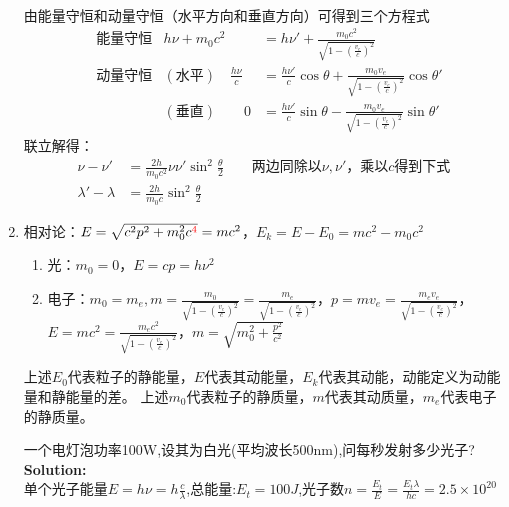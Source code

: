 \documentclass{article}
\begin{document}
\begin{enumerate}[label=(\arabic*)]
\begin{tabular}{cccc|ccc}
				\end{tabular}\\
				由能量守恒和动量守恒（水平方向和垂直方向）可得到三个方程式
				\begin{align}
					&\text{能量守恒} & h\nu+m_0c^2 &= h\nu'+\frac{m_0c^2}{\sqrt{1-(\frac{v_e}{c})^2}} \label{能量守恒eq1} \\
					&\text{动量守恒} & (\text{水平}) \quad \frac{h\nu}{c} &= \frac{h\nu'}{c}\cos\theta + \frac{m_0v_e}{\sqrt{1-(\frac{v_e}{c})^2}}\cos\theta' \label{水平动量eq2} \\
					&   & (\text{垂直}) \qquad 0 &= \frac{h\nu'}{c}\sin\theta - \frac{m_0v_e}{\sqrt{1-(\frac{v_e}{c})^2}}\sin\theta' \label{垂直动量eq3}
				\end{align}
				联立解得：
				\[
					\begin{aligned}
						\nu-\nu' &= \frac{2h}{m_0c^2}\nu \nu'\sin^2\frac{\theta}{2} \qquad \text{两边同除以$\nu,\nu'$，乘以$c$得到下式}\\
						\lambda'-\lambda &= \frac{2h}{m_0c}\sin^2\frac{\theta}{2}
					\end{aligned}
				\]
	\item 相对论：$E=\sqrt{c^2p^2+m_0^2c^{\color{red} 4}}=mc^2$，$E_k=E-E_0=mc^2-m_0c^2$
				\begin{enumerate}[label=(\alph*)]
					\item 光：$m_0=0$，$E=cp=h\nu ^2$
					\item 电子：$m_0=m_e,m=\frac{m_0}{\sqrt{1-(\frac{v_e}{c})^2}}=\frac{m_e}{\sqrt{1-(\frac{v_e}{c})^2}}$，$p=mv_e=\frac{m_e v_e}{\sqrt{1-(\frac{v_e}{c})^2}}$，$E=mc^2=\frac{m_e c^2}{\sqrt{1-(\frac{v_e}{c})^2}}$，$m=\sqrt{m_0^2+\frac{p^2}{c^2}}$
				\end{enumerate}
				\begin{remark}
					上述$E_0$代表粒子的静能量，$E$代表其动能量，$E_k$代表其动能，动能定义为动能量和静能量的差。
					上述$m_0$代表粒子的静质量，$m$代表其动质量，$m_e$代表电子的静质量。
				\end{remark}
				\begin{example}
					一个电灯泡功率100W,设其为白光(平均波长500nm),问每秒发射多少光子?\\
					\textbf{Solution:\\}
					单个光子能量$E = h\nu = h\frac{c}{\lambda}$,总能量:$E_t=100\si{J}$,光子数$n=\frac{E_t}{E}=\frac{E_t\lambda}{hc}=2.5\times 10^{20}$
				\end{example}
\end{enumerate}
\end{document}
